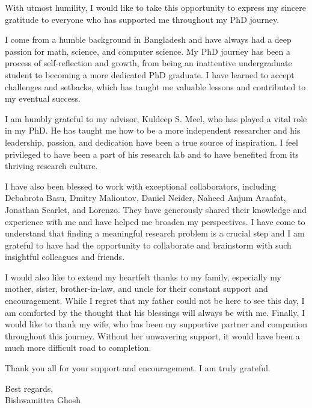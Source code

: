 \begin{acknowledgments}
	
With utmost humility, I would like to take this opportunity to express my sincere gratitude to everyone who has supported me throughout my PhD journey.

I come from a humble background in Bangladesh and have always had a deep passion for math, science, and computer science. My PhD journey has been a process of self-reflection and growth, from being an inattentive undergraduate student to becoming a more dedicated PhD graduate. I have learned to accept challenges and setbacks, which has taught me valuable lessons and contributed to my eventual success.

I am humbly grateful to my advisor, Kuldeep S. Meel, who has played a vital role in my PhD. He has taught me how to be a more independent researcher and his leadership, passion, and dedication have been a true source of inspiration. I feel privileged to have been a part of his research lab and to have benefited from its thriving research culture.

I have also been blessed to work with exceptional collaborators, including Debabrota Basu, Dmitry Malioutov, Daniel Neider, Naheed Anjum Araafat, Jonathan Scarlet, and Lorenzo. They have generously shared their knowledge and experience with me and have helped me broaden my perspectives. I have come to understand that finding a meaningful research problem is a crucial step and I am grateful to have had the opportunity to collaborate and brainstorm with such insightful colleagues and friends.

I would also like to extend my heartfelt thanks to my family, especially my mother, sister, brother-in-law, and uncle for their constant support and encouragement. While I regret that my father could not be here to see this day, I am comforted by the thought that his blessings will always be with me. Finally, I would like to thank my wife, who has been my supportive partner and companion throughout this journey. Without her unwavering support, it would have been a much more difficult road to completion.

Thank you all for your support and encouragement. I am truly grateful.

\vspace{2em}
\noindent Best regards,\\
Bishwamittra Ghosh
	
\end{acknowledgments}
